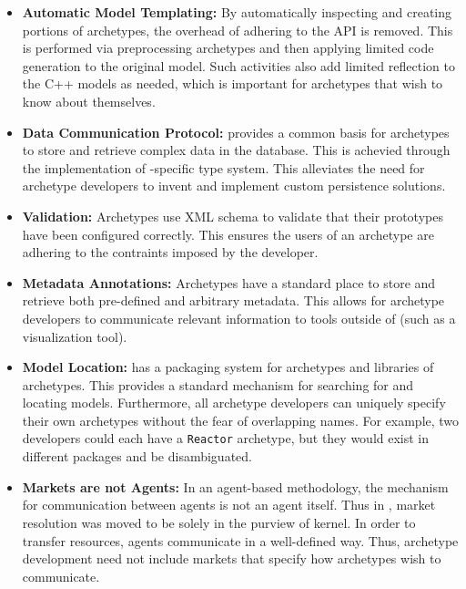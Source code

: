 \begin{itemize}
    \item \textbf{Automatic Model Templating:}  By automatically
        inspecting and creating portions of archetypes, the overhead
        of adhering to the \cyclus \gls{API} is removed. This is performed
        via preprocessing archetypes and then applying limited code generation
        to the original model. Such activities also
        add limited reflection to the C++ models as needed, which is important
        for archetypes that wish to know about themselves.

    \item \textbf{Data Communication Protocol:} \Cyclus
        provides a common basis for archetypes to store and retrieve
        complex data in the database. This is achevied through the
        implementation of \Cyclus-specific type system.
        This alleviates the need for archetype
        developers to invent and implement custom persistence solutions.

    \item \textbf{Validation:} Archetypes use \gls{XML} schema to validate that
        their prototypes have been configured correctly.
        This ensures the users of an archetype are adhering to the contraints
        imposed by the developer.

    \item \textbf{Metadata Annotations:} Archetypes have a standard place to
        store and retrieve both pre-defined and arbitrary metadata.
        This allows for archetype developers to communicate relevant information
        to tools outside of \cyclus (such as a visualization tool).

    \item \textbf{Model Location:} \Cyclus has a packaging system for archetypes and
        libraries of archetypes. This provides a standard mechanism for
        searching for and locating models.
        Furthermore, all archetype developers can
        uniquely specify their own archetypes without the fear of overlapping
        names.  For example, two developers could each have a \texttt{Reactor}
        archetype, but they would exist in different packages and be
        disambiguated.

    \item \textbf{Markets are not Agents:} In an agent-based methodology,
        the mechanism for communication between agents is not an agent itself.
        Thus in \cyclus, market resolution was moved to be solely in the purview
        of kernel. In order to transfer resources, agents communicate
        in a well-defined way. Thus, archetype development need not
        include markets that specify how archetypes wish to communicate.

\end{itemize}

